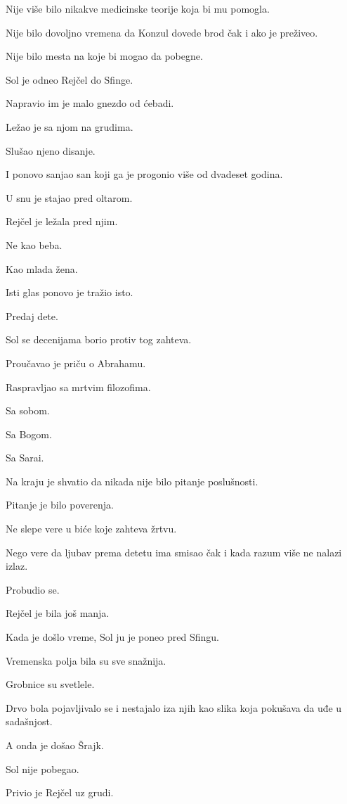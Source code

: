 Nije više bilo nikakve medicinske teorije koja bi mu pomogla.

Nije bilo dovoljno vremena da Konzul dovede brod čak i ako je preživeo.

Nije bilo mesta na koje bi mogao da pobegne.

Sol je odneo Rejčel do Sfinge.

Napravio im je malo gnezdo od ćebadi.

Ležao je sa njom na grudima.

Slušao njeno disanje.

I ponovo sanjao san koji ga je progonio više od dvadeset godina.

\bigskip

U snu je stajao pred oltarom.

Rejčel je ležala pred njim.

Ne kao beba.

Kao mlada žena.

Isti glas ponovo je tražio isto.

Predaj dete.

Sol se decenijama borio protiv tog zahteva.

Proučavao je priču o Abrahamu.

Raspravljao sa mrtvim filozofima.

Sa sobom.

Sa Bogom.

Sa Sarai.

Na kraju je shvatio da nikada nije bilo pitanje poslušnosti.

Pitanje je bilo poverenja.

Ne slepe vere u biće koje zahteva žrtvu.

Nego vere da ljubav prema detetu ima smisao čak i kada razum više ne nalazi izlaz.

Probudio se.

Rejčel je bila još manja.

\bigskip

Kada je došlo vreme, Sol ju je poneo pred Sfingu.

Vremenska polja bila su sve snažnija.

Grobnice su svetlele.

Drvo bola pojavljivalo se i nestajalo iza njih kao slika koja pokušava da uđe u sadašnjost.

A onda je došao Šrajk.

Sol nije pobegao.

Privio je Rejčel uz grudi.

